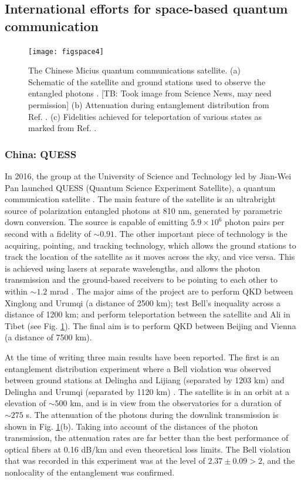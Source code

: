 \documentclass[aps,rmp,reprint,amsmath,amssymb,graphicx,longbibliography]{revtex4-1}
\begin{document}
\subsection{International efforts for space-based quantum communication}


\begin{figure}
\texttt{[image: figspace4]}
\caption{The Chinese Micius quantum communications satellite.  (a) Schematic of the satellite and ground stations used to observe the entangled photons \cite{popkin17}.  [TB: Took image from Science News, may need permission] (b) Attenuation during entanglement distribution from Ref. \cite{yin2017satellite}.  (c) Fidelities achieved for teleportation of various states as marked from Ref. \cite{ren2017ground}.  
}
\label{figspace4}
\end{figure}




\subsubsection{China: QUESS}

In 2016, the group at the University of Science and Technology led by Jian-Wei Pan launched QUESS (Quantum Science Experiment Satellite), a quantum communication satellite \cite{gibney16,xin11}. The main feature of the satellite is an ultrabright source of polarization entangled photons at 810 nm, generated by parametric down conversion.  The source is capable of emitting $ 5.9 \times 10^6 $ photon pairs per second with a fidelity of $ \sim 0.91 $.  The other important piece of technology is the acquiring, pointing, and tracking technology, which allows the ground stations to track the location of the satellite as it moves across the sky, and vice versa.  This is achieved using lasers at separate wavelengths, and allows the photon transmission and the ground-based receivers to be pointing to each other to within $ \sim 1.2 $ mrad \cite{yin2017satellite}.  The major aims of the project are to perform QKD between Xinglong and Urumqi (a distance of 2500 km); test Bell’s inequality across a distance of 1200 km; and perform teleportation between the satellite and Ali in Tibet (see Fig. \ref{figspace4}).  The final aim is to perform QKD between Beijing and Vienna (a distance of 7500 km). 

At the time of writing three main results have been reported.  The first is an entanglement distribution experiment where a Bell violation was observed between ground stations at Delingha and Lijiang (separated by 1203 km) and Delingha and Urumqi (separated by 1120 km) \cite{yin2017satellite}.  The satellite is in an orbit at a elevation of $ \sim 500$ km, and is in view from the observatories for a duration of $ \sim 275 $ s.
The attenuation of the photons during the downlink transmission is shown in Fig. \ref{figspace4}(b). Taking into account of the distances of the photon transmission, the attenuation rates are far better than the best performance of optical fibers at 0.16 dB/km \cite{yin2013lower} and even theoretical loss limits.  The Bell violation that was recorded in this experiment was at the level of $ 2.37 \pm 0.09 > 2 $, and the nonlocality of the entanglement was confirmed.
\end{document}
